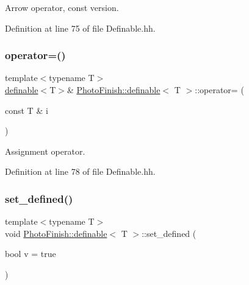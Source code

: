 Arrow operator, const version. 



Definition at line 75 of file Definable.\+hh.

\mbox{\label{class_photo_finish_1_1definable_a9d4202ced2d61cafad392d48db9ccfc6}} 
\subsubsection{\texorpdfstring{operator=()}{operator=()}}
{\footnotesize\ttfamily template$<$typename T$>$ \\
\hyperlink{class_photo_finish_1_1definable}{definable}$<$T$>$\& \hyperlink{class_photo_finish_1_1definable}{Photo\+Finish\+::definable}$<$ T $>$\+::operator= (\begin{DoxyParamCaption}\item[{const T \&}]{i }\end{DoxyParamCaption})\hspace{0.3cm}{\ttfamily [inline]}}



Assignment operator. 



Definition at line 78 of file Definable.\+hh.

\mbox{\label{class_photo_finish_1_1definable_a0a5c7b94bc7298e26557fe0fe084f730}} 
\subsubsection{\texorpdfstring{set\+\_\+defined()}{set\_defined()}}
{\footnotesize\ttfamily template$<$typename T$>$ \\
void \hyperlink{class_photo_finish_1_1definable}{Photo\+Finish\+::definable}$<$ T $>$\+::set\+\_\+defined (\begin{DoxyParamCaption}\item[{bool}]{v = {\ttfamily true} }\end{DoxyParamCaption})\hspace{0.3cm}{\ttfamily [inline]}}



